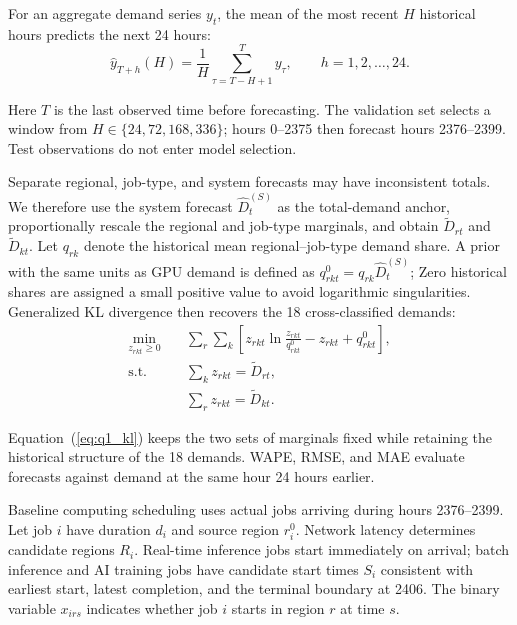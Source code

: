 For an aggregate demand series $y_t$,
the mean of the most recent $H$ historical hours predicts the next 24 hours:
\begin{equation}
	\hat{y}_{T+h}(H)
	=
	\frac{1}{H}
	\sum_{\tau=T-H+1}^{T}y_{\tau},
	\qquad h=1,2,\ldots,24 .
	\label{eq:q1_localmean}
\end{equation}

Here $T$ is the last observed time before forecasting. The validation set selects a window from $H\in\{24,72,168,336\}$; hours 0--2375 then forecast hours 2376--2399. Test observations do not enter model selection.

Separate regional, job-type, and system forecasts may have inconsistent totals.
We therefore use the system forecast $\hat D_t^{(S)}$ as the total-demand anchor,
proportionally rescale the regional and job-type marginals,
and obtain $\tilde D_{rt}$ and $\tilde D_{kt}$.
Let $q_{rk}$ denote the historical mean regional--job-type demand share.
A prior with the same units as GPU demand is defined as
$q^0_{rkt}=q_{rk}\hat D_t^{(S)}$;
Zero historical shares are assigned a small positive value to avoid logarithmic singularities.
Generalized KL divergence then recovers the 18 cross-classified demands:
\begin{equation}
	\begin{aligned}
		\min_{z_{rkt}\geq0}\quad
		&\sum_r\sum_k
		\left[
		z_{rkt}\ln\frac{z_{rkt}}{q^0_{rkt}}
		-z_{rkt}+q^0_{rkt}
		\right],\\
		\mathrm{s.t.}\quad
		&\sum_kz_{rkt}=\tilde D_{rt},\\
		&\sum_rz_{rkt}=\tilde D_{kt}.
	\end{aligned}
	\label{eq:q1_kl}
\end{equation}

Equation~(\ref{eq:q1_kl}) keeps the two sets of marginals fixed while retaining the historical structure of the 18 demands. WAPE, RMSE, and MAE evaluate forecasts against demand at the same hour 24 hours earlier.

Baseline computing scheduling uses actual jobs arriving during hours 2376--2399.
Let job $i$ have duration $d_i$ and source region $r_i^0$.
Network latency determines candidate regions $R_i$.
Real-time inference jobs start immediately on arrival;
batch inference and AI training jobs have candidate start times $S_i$ consistent with earliest start, latest completion, and the terminal boundary at 2406.
The binary variable $x_{irs}$ indicates whether job $i$ starts in region $r$ at time $s$.

